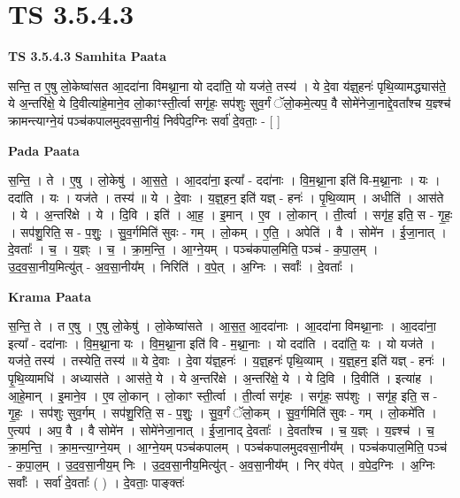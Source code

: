 \documentclass[17pt]{extarticle}
\begin{document}
\section{ TS 3.5.4.3 }

\textbf{TS 3.5.4.3 } \newline
\textbf{Samhita Paata} \newline

सन्ति॒ त ए॒षु लो॒केष्वा॑सत आ॒ददा॑ना विमथ्ना॒ना यो ददा॑ति॒ यो यज॑ते॒ तस्य॑ । ये दे॒वा य॑ज्ञ्॒हनः॑ पृथि॒व्यामद्ध्यास॑ते॒ ये अ॒न्तरि॑क्षे॒ ये दि॒वीत्या॑हे॒माने॒व लो॒काꣳस्ती॒र्त्वा सगृ॑हः॒ सप॑शुः सुव॒र्गं ॅलो॒कमे॒त्यप॒ वै सोमे॑नेजा॒नाद्दे॒वता᳚श्च य॒ज्ञ्श्च॑ क्रामन्त्याग्ने॒यं पञ्च॑कपालमुदवसा॒नीयं॒ निर्व॑पेद॒ग्निः सर्वा॑ दे॒वताः॒ - [  ] \newline

\textbf{Pada Paata} \newline

स॒न्ति॒ । ते । ए॒षु । लो॒केषु॑ । आ॒स॒ते॒ । आ॒ददा॑ना॒ इत्या᳚ - ददा॑नाः । वि॒म॒थ्ना॒ना इति॑ वि-म॒थ्ना॒नाः । यः । ददा॑ति । यः । यज॑ते । तस्य॑ ॥ ये । दे॒वाः । य॒ज्ञ्॒हन॒ इति॑ यज्ञ् - हनः॑ । पृ॒थि॒व्याम् । अधीति॑ । आस॑ते । ये । अ॒न्तरि॑क्षे । ये । दि॒वि । इति॑ । आ॒ह॒ । इ॒मान् । ए॒व । लो॒कान् । ती॒र्त्वा । सगृ॑ह॒ इति॒ स - गृ॒हः॒ । सप॑शु॒रिति॒ स - प॒शुः॒ । सु॒व॒र्गमिति॑ सुवः - गम् । लो॒कम् । ए॒ति॒ । अपेति॑ । वै । सोमे॑न । ई॒जा॒नात् । दे॒वताः᳚ । च॒ । य॒ज्ञ्ः । च॒ । क्रा॒म॒न्ति॒ । आ॒ग्ने॒यम् । पञ्च॑कपाल॒मिति॒ पञ्च॑ - क॒पा॒ल॒म् । उ॒द॒व॒सा॒नीय॒मित्यु॑त् - अ॒व॒सा॒नीय᳚म् । निरिति॑ । व॒पे॒त् । अ॒ग्निः । सर्वाः᳚ । दे॒वताः᳚ ।  \newline


\textbf{Krama Paata} \newline

स॒न्ति॒ ते । त ए॒षु । ए॒षु लो॒केषु॑ । लो॒केष्वा॑सते । आ॒स॒त॒ आ॒ददा॑नाः । आ॒ददा॑ना विमथ्ना॒नाः । आ॒ददा॑ना॒ इत्या᳚ - ददा॑नाः । वि॒म॒थ्ना॒ना यः । वि॒म॒थ्ना॒ना इति॑ वि - म॒थ्ना॒नाः । यो ददा॑ति । ददा॑ति॒ यः । यो यज॑ते । यज॑ते॒ तस्य॑ । तस्येति॒ तस्य॑ ॥ ये दे॒वाः । दे॒वा य॑ज्ञ्॒हनः॑ । य॒ज्ञ्॒हनः॑ पृथि॒व्याम् । य॒ज्ञ्॒हन॒ इति॑ यज्ञ् - हनः॑ । पृ॒थि॒व्यामधि॑ । अध्यास॑ते । आस॑ते॒ ये । ये अ॒न्तरि॑क्षे । अ॒न्तरि॑क्षे॒ ये । ये दि॒वि । दि॒वीति॑ । इत्या॑ह । आ॒हे॒मान् । इ॒माने॒व । ए॒व लो॒कान् । लो॒काꣳ स्ती॒र्त्वा । ती॒र्त्वा सगृ॑हः । सगृ॑हः॒ सप॑शुः । सगृ॑ह॒ इति॒ स - गृ॒हः॒ । सप॑शुः सुव॒र्गम् । सप॑शु॒रिति॒ स - प॒शुः॒ । सु॒व॒र्गं ॅलो॒कम् । सु॒व॒र्गमिति॑ सुवः - गम् । लो॒कमे॑ति । ए॒त्यप॑ । अप॒ वै । वै सोमे॑न । सोमे॑नेजा॒नात् । ई॒जा॒नाद् दे॒वताः᳚ । दे॒वता᳚श्च । च॒ य॒ज्ञ्ः । य॒ज्ञ्श्च॑ । च॒ क्रा॒म॒न्ति॒ । क्रा॒म॒न्त्या॒ग्ने॒यम् । आ॒ग्ने॒यम् पञ्च॑कपालम् । पञ्च॑कपालमुदवसा॒नीय᳚म् । पञ्च॑कपाल॒मिति॒ पञ्च॑ - क॒पा॒ल॒म् । उ॒द॒व॒सा॒नीय॒म् निः । उ॒द॒व॒सा॒नीय॒मित्यु॑त् - अ॒व॒सा॒नीय᳚म् । निर् व॑पेत् । व॒पे॒द॒ग्निः । अ॒ग्निः सर्वाः᳚ । सर्वा॑ दे॒वताः᳚ ( ) । दे॒वताः॒ पाङ्क्तः॑ \newline
\end{document}
